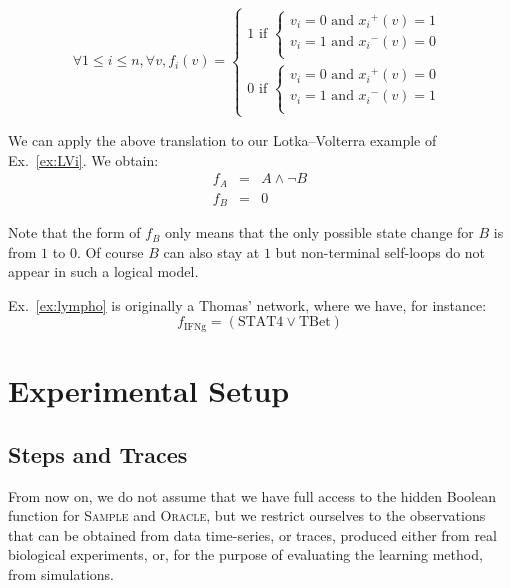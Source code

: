 \documentclass{llncs}
\begin{document}
\[
\forall 1 \leq i \leq n, \forall v, f_i(v) = \left\{\begin{array}{l}
1 \text{ if } \left\{\begin{array}{l}
v_i = 0 \text{ and } {x_i}^+(v) = 1\\
v_i = 1 \text{ and } {x_i}^-(v) = 0 \\
\end{array}\right.\\[1em]
0 \text{ if } \left\{\begin{array}{l}
v_i = 0 \text{ and } {x_i}^+(v) = 0\\
v_i = 1 \text{ and } {x_i}^-(v) = 1\\
\end{array}\right.
\end{array}\right.
\]

\begin{example}
   We can apply the above translation to our Lotka--Volterra example of
   Ex.~\ref{ex:LVi}. We obtain:
   \begin{eqnarray*}
   f_A &=& A \wedge\neg B\\
   f_B &=& 0
   \end{eqnarray*}

   Note that the form of $f_B$ only means that the only possible state change
   for $B$ is from $1$ to $0$. Of course $B$ can also stay at $1$ but
   non-terminal self-loops do not appear in such a logical model.
\end{example}

\begin{example}
   Ex.~\ref{ex:lympho} is originally a Thomas' network, where we have, for
   instance:
   \[f_\text{IFNg}=(\text{STAT4}\vee \text{TBet})\]
\end{example}

\section{Experimental Setup}


\subsection{Steps and Traces}

From now on, we do not assume %
that we have full access to the hidden Boolean function for
\textsc{Sample} and \textsc{Oracle}, but we restrict ourselves to the observations that can be obtained from data time-series, or traces,
produced either from real biological experiments, or, for the purpose of evaluating the learning method, from simulations.
\end{document}
